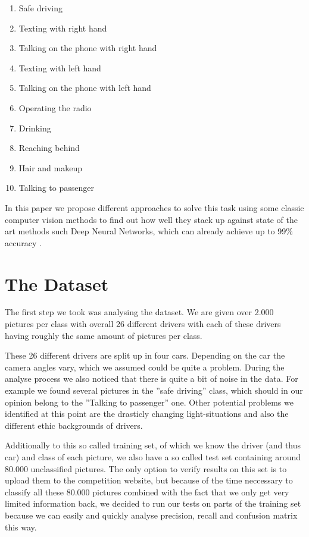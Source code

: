\documentclass[10pt,twocolumn,letterpaper]{article}
\begin{document}
\begin{enumerate}
	\item Safe driving
	\item Texting with right hand
	\item Talking on the phone with right hand
	\item Texting with left hand
	\item Talking on the phone with left hand
	\item Operating the radio
	\item Drinking
	\item Reaching behind
	\item Hair and makeup
	\item Talking to passenger
\end{enumerate}

In this paper we propose different approaches to solve this task using some classic computer vision methods to find out how well they stack up against state of the art methods such Deep Neural Networks, which can already achieve up to 99\% accuracy .

\section{The Dataset}
The first step we took was analysing the dataset. We are given over 2.000 pictures per class with overall 26 different drivers with each of these drivers having roughly the same amount of pictures per class. 

These 26 different drivers are split up in four cars. Depending on the car the camera angles vary, which we assumed could be quite a problem. During the analyse process we also noticed that there is quite a bit of noise in the data. For example we found several pictures in the ''safe driving'' class, which should in our opinion belong to the ''Talking to passenger'' one. Other potential problems we identified at this point are the drasticly changing light-situations and also the different ethic backgrounds of drivers.

Additionally to this so called training set, of which we know the driver (and thus car) and class of each picture, we also have a so called test set containing around 80.000 unclassified pictures. The only option to verify results on this set is to upload them to the competition website, but because of the time neccessary to classify all these 80.000 pictures combined with the fact that we only get very limited information back, we decided to run our tests on parts of the training set because we can easily and quickly analyse precision, recall and confusion matrix this way.
\end{document}
